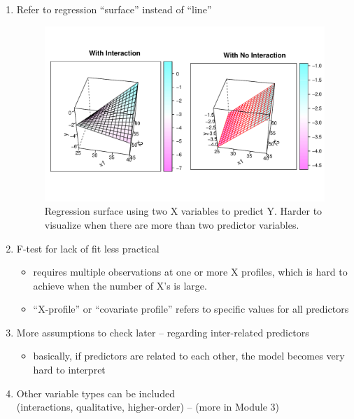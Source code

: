 \documentclass[12pt]{notes}
\begin{document}
\begin{enumerate}
\item Refer to regression ``surface'' instead of ``line''\\ 

\begin{figure}[H]
\includegraphics[width = \textwidth, trim = 0cm 1cm 0cm 1cm, clip]{figures/module2/surface.pdf}
\caption{Regression surface using two X variables to predict Y. Harder to visualize when there are more than two predictor variables.}
\end{figure}

\item F-test for lack of fit less practical
\begin{itemize}
  \item requires multiple observations at one or more X profiles, which is hard to achieve when the number of X's is large. 
  \item ``X-profile'' or ``covariate profile'' refers to specific values for all predictors
\end{itemize}

\item More assumptions to check later -- regarding inter-related predictors
\begin{itemize}
 \item basically, if predictors are related to each other, the model becomes very hard to interpret
\end{itemize}

\item Other variable types can be included\\
(interactions, qualitative, higher-order) -- (more in Module 3)\\


\end{enumerate}
\end{document}
